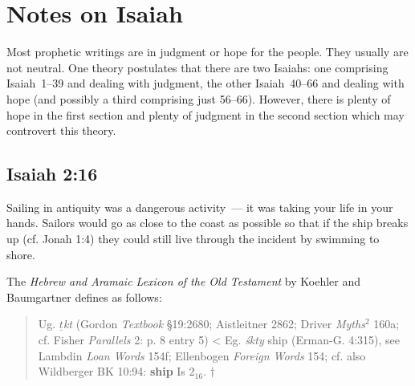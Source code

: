 \chapter{Notes on Isaiah}\label{app:isaiah}
Most prophetic writings are in judgment or hope for the people. They usually are not neutral. One theory postulates that there are two Isaiahs: one comprising Isaiah~1--39 and dealing with judgment, the other Isaiah~40--66 and dealing with hope (and possibly a third comprising just 56--66). However, there is plenty of hope in the first section and plenty of judgment in the second section which may controvert this theory.

\section{Isaiah 2:16}\label{app:isa-2-16}
Sailing in antiquity was a dangerous activity~--- it was taking your life in your hands. Sailors would go as close to the coast as possible so that if the ship breaks up (cf. Jonah 1:4) they could still live through the incident by swimming to shore.

The \emph{Hebrew and Aramaic Lexicon of the Old Testament} by Koehler and Baumgartner defines  as follows:
\begin{quote}
    Ug. \emph{$\underline{t}$kt} (Gordon \emph{Textbook} \S19:2680; Aistleitner 2862; Driver \emph{Myths}$^2$ 160a; cf. Fisher \emph{Parallels} 2: p. 8 entry 5) < Eg. \emph{\'skty} ship (Erman-G. 4:315), see Lambdin \emph{Loan Words} 154f; Ellenbogen \emph{Foreign Words} 154; cf. also Wildberger BK 10:94: \textbf{ship} Is 2$_{16}$. $\dagger$
\end{quote}

